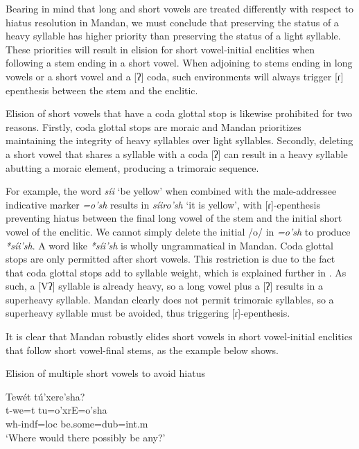 Bearing in mind that long and short vowels are treated differently with respect to hiatus resolution in Mandan, we must conclude that preserving the status of a heavy syllable has higher priority than preserving the status of a light syllable. These priorities will result in elision for short vowel-initial enclitics when following a stem ending in a short vowel. When adjoining to stems ending in long vowels or a short vowel and a [ʔ] coda, such environments will always trigger [ɾ] epenthesis between the stem and the enclitic.

Elision of short vowels that have a coda glottal stop is likewise prohibited for two reasons. Firstly, coda glottal stops are moraic and Mandan prioritizes maintaining the integrity of heavy syllables over light syllables. Secondly, deleting a short vowel that shares a syllable with a coda [ʔ] can result in a heavy syllable abutting a moraic element, producing a trimoraic sequence.

For example, the word \textit{síi} `be yellow' when combined with the male-addressee indicative marker \textit{=o'sh} results in \textit{síiro'sh} `it is yellow', with [ɾ]-epenthesis preventing hiatus between the final long vowel of the stem and the initial short vowel of the enclitic. We cannot simply delete the initial /o/ in \textit{=o'sh} to produce \textit{*síi'sh}. A word like \textit{*síi'sh} is wholly ungrammatical in Mandan. Coda glottal stops are only permitted after short vowels. This restriction is due to the fact that coda glottal stops add to syllable weight, which is explained further in . As such, a [Vʔ] syllable is already heavy, so a long vowel plus a [ʔ] results in a superheavy syllable. Mandan clearly does not permit trimoraic syllables, so a superheavy syllable must be avoided, thus triggering [ɾ]-epenthesis.

It is clear that Mandan robustly elides short vowels in short vowel-initial enclitics that follow short vowel-final stems, as the example below shows.

\begin{exe}

\item\label{shortvowelsgone} Elision of multiple short vowels to avoid hiatus

 \glll Tewét tú'xere'sha?\\
	t-we=t tu=o'xrE=o'sha\\
	wh-indf=loc \textnormal{be.some}=dub=int.m\\
\glt	`Where would there possibly be any?' \citep[34]{mixco1997a}

\end{exe}

